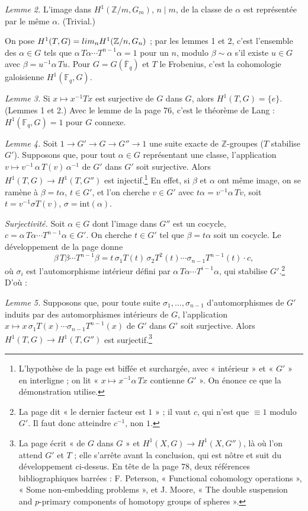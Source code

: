 \documentclass[11pt,a4paper]{article}
\begin{document}
\emph{Lemme 2.} L'image dans $H^1(\mathbb{Z}/m, G_m)$, $n \mid m$, de la classe
de $\alpha$ est représentée par le même $\alpha$. (Trivial.)

On pose $H^1(T, G) = \varinjlim_n H^1(\mathbb{Z}/n, G_n)$ ; par les lemmes 1 et
2, c'est l'ensemble des $\alpha \in G$ tels que $\alpha\,T\alpha \cdots
T^{n-1}\alpha = 1$ pour un $n$, modulo $\beta \sim \alpha$ s'il existe $u \in G$
avec $\beta = u^{-1}\alpha\,Tu$. Pour $G = G(\overline{\mathbb{F}}_q)$ et $T$ le
Frobenius, c'est la cohomologie galoisienne $H^1(\mathbb{F}_q, G)$.

\emph{Lemme 3.} Si $x \mapsto x^{-1}Tx$ est surjective de $G$ dans $G$, alors
$H^1(T, G) = \lbrace e\rbrace$. (Lemmes 1 et 2.) Avec le lemme de la page 76,
c'est le théorème de Lang : $H^1(\mathbb{F}_q, G) = 1$ pour $G$ connexe.

\emph{Lemme 4.} Soit $1 \to G' \to G \to G'' \to 1$ une suite exacte de
$\mathbb{Z}$-groupes ($T$ stabilise $G'$). Supposons que, pour tout $\alpha \in
G$ représentant une classe, l'application $v \mapsto v^{-1}\,\alpha\,T(v)\,
\alpha^{-1}$ de $G'$ dans $G'$ soit surjective. Alors $H^1(T, G) \to H^1(T,
G'')$ est injectif.\footnote{L'hypothèse de la page est biffée et surchargée,
avec « intérieur » et « $G'$ » en interligne ; on lit « $x \mapsto
x^{-1}\alpha\,Tx$ contienne $G'$ ». On énonce ce que la démonstration
utilise.} En effet, si $\beta$ et $\alpha$ ont même image, on se ramène à
$\beta = t\alpha$, $t \in G'$, et l'on cherche $v \in G'$ avec $t\alpha =
v^{-1}\alpha\,Tv$, soit $t = v^{-1}\sigma T(v)$, $\sigma = \mathrm{int}(\alpha)$.

\emph{Surjectivité.} Soit $\alpha \in G$ dont l'image dans $G''$ est un cocycle,
$c = \alpha\,T\alpha \cdots T^{n-1}\alpha \in G'$. On cherche $t \in G'$ tel que
$\beta = t\alpha$ soit un cocycle. Le développement de la page donne
\[
\beta\,T\beta \cdots T^{n-1}\beta = t\,\sigma_1T(t)\,\sigma_2T^{2}(t) \cdots
\sigma_{n-1}T^{n-1}(t)\cdot c,
\]
où $\sigma_i$ est l'automorphisme intérieur défini par $\alpha\,T\alpha \cdots
T^{i-1}\alpha$, qui stabilise $G'$.\footnote{La page dit « le dernier facteur
est $1$ » ; il vaut $c$, qui n'est que $\equiv 1$ modulo $G'$. Il faut donc
atteindre $c^{-1}$, non $1$.} D'où :

\emph{Lemme 5.} Supposons que, pour toute suite $\sigma_1, \ldots,
\sigma_{n-1}$ d'automorphismes de $G'$ induits par des automorphismes
intérieurs de $G$, l'application $x \mapsto x\,\sigma_1T(x) \cdots
\sigma_{n-1}T^{n-1}(x)$ de $G'$ dans $G'$ soit surjective. Alors $H^1(T, G) \to
H^1(T, G'')$ est surjectif.\footnote{La page écrit « de $G$ dans $G$ » et
$H^1(X, G) \to H^1(X, G'')$, là où l'on attend $G'$ et $T$ ; elle s'arrête
avant la conclusion, qui est nôtre et suit du développement ci-dessus. En tête
de la page 78, deux références bibliographiques barrées : F. Peterson,
« Functional cohomology operations », « Some non-embedding problems », et
J. Moore, « The double suspension and $p$-primary components of homotopy groups
of spheres ».}
\end{document}

